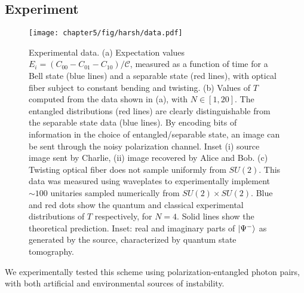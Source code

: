 \subsection{Experiment}
\begin{figure}[t!]
\texttt{[image: chapter5/fig/harsh/data.pdf]}
\caption[Detecting entanglement by bending single-mode fiber]{Experimental data. (a) Expectation values $E_i = (C_{00}-C_{01}-C_{10})/\mathcal{C}$, measured as a function of time for a Bell state (blue lines) and a separable state (red lines), with optical fiber subject to constant bending and twisting. (b) Values of $T$ computed from the data shown in (a), with $N \in \left[1, 20\right]$. The entangled distributions (red lines) are clearly distinguishable from the separable state data (blue lines). By encoding bits of information in the choice of entangled/separable state, an image can be sent through the noisy polarization channel. Inset (i) source image sent by Charlie, (ii) image recovered by Alice and Bob. (c) Twisting optical fiber does not sample uniformly from $SU(2)$. This data was measured using waveplates to experimentally implement $\sim100$ unitaries sampled numerically from $SU(2)\times SU(2)$. Blue and red dots show the quantum and classical experimental distributions of $T$ respectively, for $N=4$. Solid lines show the theoretical prediction. Inset: real and imaginary parts of $\mbox{$ | \Psi^- \rangle $}$ as generated by the source, characterized by quantum state tomography.
}
\label{fig:harsh-noise-data}
\end{figure}

We experimentally tested this scheme using polarization-entangled photon pairs, with both artificial and environmental sources of instability.

